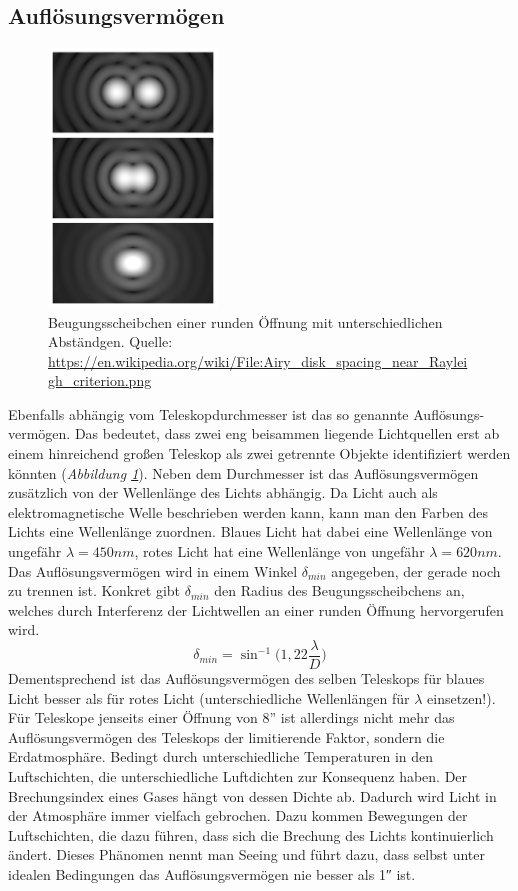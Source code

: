 \documentclass[10pt,a4paper,titlepage]{article}
\begin{document}
\subsection{Auflösungsvermögen}
\begin{figure}[h!]
  \centering
    \includegraphics[width=0.4\textwidth]{Airy_disk}
  \caption{Beugungsscheibchen einer runden Öffnung mit unterschiedlichen Abständgen. Quelle: \url{https://en.wikipedia.org/wiki/File:Airy_disk_spacing_near_Rayleigh_criterion.png}}
  \label{fig:aufloesung}
\end{figure}
Ebenfalls abhängig vom Teleskopdurchmesser ist das so genannte Auflösungs-vermögen. Das bedeutet, dass zwei eng beisammen liegende Lichtquellen erst ab einem hinreichend großen Teleskop als zwei getrennte Objekte identifiziert werden könnten (\textit{Abbildung \ref{fig:aufloesung}}). Neben dem Durchmesser ist das Auflösungsvermögen zusätzlich von der Wellenlänge des Lichts abhängig. Da Licht auch als elektromagnetische Welle beschrieben werden kann, kann man den Farben des Lichts eine Wellenlänge zuordnen. Blaues Licht hat dabei eine Wellenlänge von ungefähr $\lambda = 450 nm$, rotes Licht hat eine Wellenlänge von ungefähr $\lambda = 620 nm$. Das Auflösungsvermögen wird in einem Winkel $\delta_{min}$ angegeben, der gerade noch zu trennen ist. Konkret gibt $\delta_{min}$ den Radius des Beugungsscheibchens an, welches durch Interferenz der Lichtwellen an einer runden Öffnung hervorgerufen wird.
\begin{equation}
\delta_{min} = \sin^{-1}\biggr(1,22 \frac{\lambda}{D}\biggr)
\end{equation}
Dementsprechend ist das Auflösungsvermögen des selben Teleskops für blaues Licht besser als für rotes Licht (unterschiedliche Wellenlängen für $\lambda$ einsetzen!). Für Teleskope jenseits einer Öffnung von 8'' ist allerdings nicht mehr das Auflösungsvermögen des Teleskops der limitierende Faktor, sondern die Erdatmosphäre. Bedingt durch unterschiedliche Temperaturen in den Luftschichten, die unterschiedliche Luftdichten zur Konsequenz haben. Der Brechungsindex eines Gases hängt von dessen Dichte ab. Dadurch wird Licht in der Atmosphäre immer vielfach gebrochen. Dazu kommen Bewegungen der Luftschichten, die dazu führen, dass sich die Brechung des Lichts kontinuierlich ändert. Dieses Phänomen nennt man Seeing und führt dazu, dass selbst unter idealen Bedingungen das Auflösungsvermögen nie besser als \ang{;;1} ist.
\end{document}
